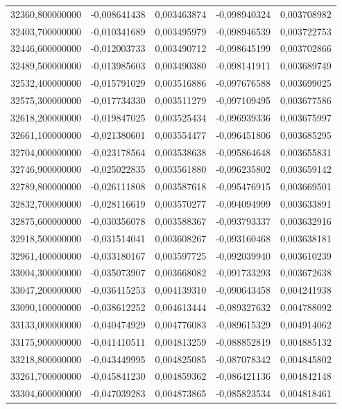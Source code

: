 \begin{longtable}{rrrrr}
32360,800000000 & -0,008641438 & 0,003463874 & -0,098940324 & 0,003708982\\
32403,700000000 & -0,010341689 & 0,003495979 & -0,098946539 & 0,003722753\\
32446,600000000 & -0,012003733 & 0,003490712 & -0,098645199 & 0,003702866\\
32489,500000000 & -0,013985603 & 0,003490380 & -0,098141911 & 0,003689749\\
32532,400000000 & -0,015791029 & 0,003516886 & -0,097676588 & 0,003699025\\
32575,300000000 & -0,017734330 & 0,003511279 & -0,097109495 & 0,003677586\\
32618,200000000 & -0,019847025 & 0,003525434 & -0,096939336 & 0,003675997\\
32661,100000000 & -0,021380601 & 0,003554477 & -0,096451806 & 0,003685295\\
32704,000000000 & -0,023178564 & 0,003538638 & -0,095864648 & 0,003655831\\
32746,900000000 & -0,025022835 & 0,003561880 & -0,096235802 & 0,003659142\\
32789,800000000 & -0,026111808 & 0,003587618 & -0,095476915 & 0,003669501\\
32832,700000000 & -0,028116619 & 0,003570277 & -0,094094999 & 0,003633891\\
32875,600000000 & -0,030356078 & 0,003588367 & -0,093793337 & 0,003632916\\
32918,500000000 & -0,031514041 & 0,003608267 & -0,093160468 & 0,003638181\\
32961,400000000 & -0,033180167 & 0,003597725 & -0,092039940 & 0,003610239\\
33004,300000000 & -0,035073907 & 0,003668082 & -0,091733293 & 0,003672638\\
33047,200000000 & -0,036415253 & 0,004139310 & -0,090643458 & 0,004241938\\
33090,100000000 & -0,038612252 & 0,004613444 & -0,089327632 & 0,004788092\\
33133,000000000 & -0,040474929 & 0,004776083 & -0,089615329 & 0,004914062\\
33175,900000000 & -0,041410511 & 0,004813259 & -0,088852819 & 0,004885132\\
33218,800000000 & -0,043449995 & 0,004825085 & -0,087078342 & 0,004845802\\
33261,700000000 & -0,045841230 & 0,004859362 & -0,086421136 & 0,004842148\\
33304,600000000 & -0,047039283 & 0,004873865 & -0,085823534 & 0,004818461\\

\end{longtable}
